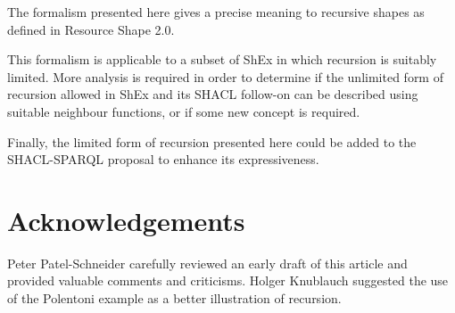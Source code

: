 \documentclass{article}
\begin{document}
The formalism presented here gives a precise meaning to recursive shapes as defined in Resource Shape 2.0.

This formalism is applicable to a subset of ShEx in which recursion is suitably limited.
More analysis is required in order to determine if the unlimited form of recursion allowed in ShEx and its SHACL follow-on
can be described using suitable neighbour functions, or if some new concept is required.

Finally, the limited form of recursion presented here could be added to the SHACL-SPARQL proposal to enhance its
expressiveness.

\cbstart
\section*{Acknowledgements}

Peter Patel-Schneider carefully reviewed an early draft of this article and provided valuable comments and criticisms.
Holger Knublauch suggested the use of the Polentoni example as a better illustration of recursion.

\cbend


\end{document}
